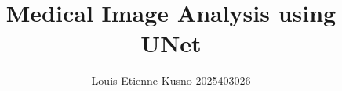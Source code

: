 \documentclass[11pt,a4paper,twocolumn]{article}
\title{\textbf{Medical Image Analysis using UNet}}
\author{Louis Etienne Kusno 2025403026}
\date{}
\begin{document}
\maketitle

\section{}
\end{document}
